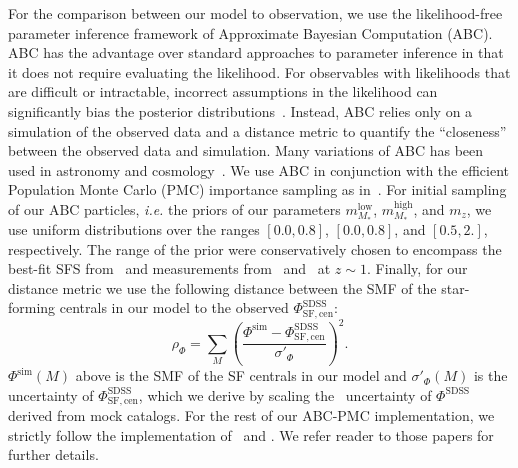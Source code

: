 \documentclass[12pt, letterpaper, preprint, tighten]{aastex62}
\newcommand{\beq}{\begin{equation}}
\newcommand{\eeq}{\end{equation}}
\begin{document}
For the comparison between our model to observation, we use the likelihood-free parameter 
inference framework of Approximate Bayesian Computation (ABC). ABC has the 
advantage over standard approaches to parameter inference in that it does not 
require evaluating the likelihood. For observables with likelihoods that are 
difficult or intractable, incorrect assumptions in the likelihood can significantly 
bias the posterior distributions~\citep[\emph{e.g.}][]{hahn2018}. Instead, 
ABC relies only on a simulation of the observed data and a distance metric to 
quantify the ``closeness'' between the observed data and simulation. Many variations 
of ABC has been used in astronomy and 
cosmology~\citep[\emph{e.g.}][]{cameron2012,weyant2013,ishida2015,alsing2018}. 
We use ABC in conjunction with the efficient Population Monte Carlo (PMC)
importance sampling as in~\citep{hahn2017b, hahn2017a}. For initial sampling 
of our ABC particles, \emph{i.e.} the priors of our parameters 
$m^\mathrm{low}_{M_*}$, $m^\mathrm{high}_{M_*}$, and $m_z$, we use uniform 
distributions over the ranges $[0.0, 0.8]$, $[0.0, 0.8]$, and 
$[0.5, 2.]$, respectively. The range of the prior were conservatively chosen 
to encompass the best-fit SFS from~\cite{speagle2014} 
and measurements from~\cite{moustakas2013} and~\cite{lee2015} at $z \sim 1$. 
Finally, for our distance metric we use the following distance between 
the SMF of the star-forming centrals in our model to the observed 
$\Phi^\mathrm{SDSS}_\mathrm{SF,cen}$: 
\beq
\rho_\Phi = \sum\limits_{M} \left( \frac{\Phi^\mathrm{sim} - \Phi^\mathrm{SDSS}_\mathrm{SF,cen}}{\sigma'_\Phi}\right)^2.
\eeq
$\Phi^\mathrm{sim}(M)$ above is the SMF of the SF centrals in our model 
and $\sigma'_\Phi(M)$ is the uncertainty of $\Phi^\mathrm{SDSS}_\mathrm{SF,cen}$, 
which we derive by scaling the~\cite{li2009} uncertainty of $\Phi^\mathrm{SDSS}$ 
derived from mock catalogs. %
For the rest of our ABC-PMC implementation, we strictly follow the implementation 
of~\cite{hahn2017a} and \cite{hahn2017b}. We refer reader to those papers for 
further details.
\end{document}
